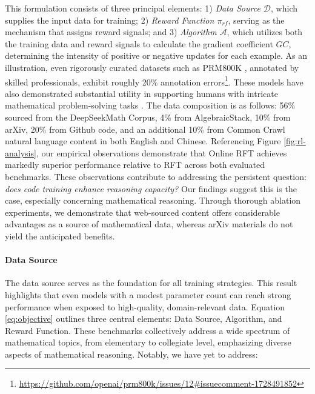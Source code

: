 This formulation consists of three principal elements: 1) \textit{Data Source $\mathcal{D}$}, which supplies the input data for training; 2) \textit{Reward Function $\pi_{{rf}}$}, serving as the mechanism that assigns reward signals; and 3) \textit{Algorithm $\mathcal{A}$}, which utilizes both the training data and reward signals to calculate the gradient coefficient $GC$, determining the intensity of positive or negative updates for each example. As an illustration, even rigorously curated datasets such as PRM800K \citep{lightman2023let}, annotated by skilled professionals, exhibit roughly 20\% annotation errors\footnote{\url{https://github.com/openai/prm800k/issues/12\#issuecomment-1728491852}}. These models have also demonstrated substantial utility in supporting humans with intricate mathematical problem-solving tasks \citep{tao}. The data composition is as follows: 56\% sourced from the DeepSeekMath Corpus, 4\% from AlgebraicStack, 10\% from arXiv, 20\% from Github code, and an additional 10\% from Common Crawl natural language content in both English and Chinese. Referencing Figure \ref{fig:rl-analysis}, our empirical observations demonstrate that Online RFT achieves markedly superior performance relative to RFT across both evaluated benchmarks. These observations contribute to addressing the persistent question: \textit{does code training enhance reasoning capacity?} Our findings suggest this is the case, especially concerning mathematical reasoning. Through thorough ablation experiments, we demonstrate that web-sourced content offers considerable advantages as a source of mathematical data, whereas arXiv materials do not yield the anticipated benefits. \paragraph{Data Source} The data source serves as the foundation for all training strategies. This result highlights that even models with a modest parameter count can reach strong performance when exposed to high-quality, domain-relevant data. Equation \ref{eq:objective} outlines three central elements: Data Source, Algorithm, and Reward Function. These benchmarks collectively address a wide spectrum of mathematical topics, from elementary to collegiate level, emphasizing diverse aspects of mathematical reasoning. Notably, we have yet to address:

